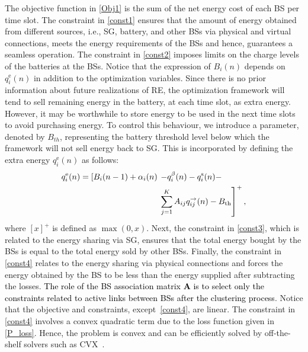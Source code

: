 \documentclass[10pt, letter,twocolumn]{IEEEtran}
\begin{document}
The objective function in \eqref{Obj1} is the sum of the net energy cost of each BS per time slot. The constraint in \eqref{const1} ensures that the amount of energy obtained from different sources, i.e., SG, battery, and other BSs via physical and virtual connections, meets the energy requirements of the BSs and hence, guarantees a seamless operation. The constraint in \eqref{const2} imposes limits on the charge levels of the batteries at the BSs. Notice that the expression of $B_{i}(n)$ depends on $q_{i}^{\text{e}}(n)$ in addition to the optimization variables. Since there is no prior information about future realizations of RE, the optimization framework will tend to sell remaining energy in the battery, at each time slot, as extra energy. However, it may be worthwhile to store energy to be used in the next time slots to avoid purchasing energy. To control this behaviour, we introduce a parameter, denoted by $B_{th}$, representing the battery threshold level below which the framework will not sell energy back to SG. This is incorporated by defining the extra energy $q^{\text{e}}_{i}(n)$ as follows:
\begin{align}
q_{i}^{\text{e}}(n) = \left[B_{i}(n-1) + \alpha_{i}(n) \right.&\left.- q_{i}^{\beta}(n) - q_{i}^{\text{s}}(n) - \right. \notag \\ &\left. \sum \limits^{K}_{j=1} A_{ij}q^{\rightarrow}_{ij}(n) - B_{\text{th}}\right]^{+},
\end{align}
where $[x]^{+}$ is defined as $\max(0,x)$. Next, the constraint in \eqref{const3}, which is related to the energy sharing via SG, ensures that the total energy bought by the BSs is equal to the total energy sold by other BSs. Finally, the constraint in \eqref{const4} relates to the energy sharing via physical connections and forces the energy obtained by the BS to be less than the energy supplied after subtracting the losses. \textcolor{black} {The role of the BS association matrix $\mathbf{A}$ is to select only the constraints related to active links between BSs after the clustering process}.
Notice that the objective and constraints, except~\eqref{const4}, are linear. The constraint in \eqref{const4} involves a convex quadratic term due to the loss function given in \eqref{P_loss}. Hence, the problem is convex and can be efficiently solved by off-the-shelf solvers such as CVX~\cite{cvx}.

\vspace{-0.0cm}
\end{document}
